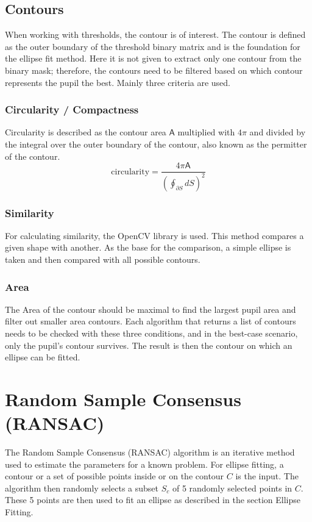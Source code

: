 \subsection{Contours}
When working with thresholds, the contour is of interest. The contour is defined as the outer boundary of the threshold binary matrix and is the foundation for the ellipse fit method. 
Here it is not given to extract only one contour from the binary mask; therefore, the contours need to be filtered based on which contour represents the pupil the best. 
Mainly three criteria are used. 

\subsubsection{Circularity / Compactness}
Circularity is described  as the contour area $\mathsf{A} $ multiplied with $4\pi$ and divided by the integral over the outer boundary of the contour, also known as the permitter of the contour.
\begin{equation}
    \text{circularity} = \frac{4\pi\mathsf{A} }{(\oint_{\partial S} dS)^2}
\end{equation}

\subsubsection{Similarity }
For calculating similarity, the OpenCV library is used. This method compares a given shape with another. As the base for the comparison, a simple ellipse is taken and then compared with all possible contours.

\subsubsection{Area}
The Area of the contour should be maximal to find the largest pupil area and filter out smaller area contours. 
Each algorithm that returns a list of contours needs to be checked with these three conditions, and in the best-case scenario, only the pupil's contour survives. The result is then the contour on which an ellipse can be fitted. 
\newpage
\section{Random Sample Consensus (RANSAC) }
\label{sus:ransac}
The Random Sample Consensus (RANSAC) \cite{derpanis_overview_nodate} algorithm is an iterative method used to estimate the parameters for a known problem. For ellipse fitting, a contour or a set of possible points inside or on the contour $C$ is the input. The algorithm then randomly selects a subset $S_c$ of 5 randomly selected points in $C$. 
These 5 points are then used to fit an ellipse as described in the section Ellipse Fitting.

